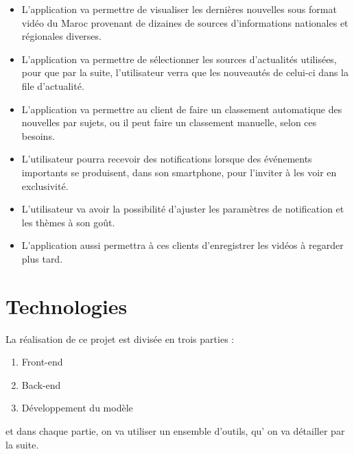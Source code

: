 \begin{itemize}
\item L'application va permettre de visualiser les dernières nouvelles sous format vidéo du Maroc provenant de dizaines de sources d'informations nationales et régionales diverses.
\item L'application va permettre de sélectionner les sources d'actualités utilisées, pour que par la suite, l'utilisateur verra que les nouveautés de  celui-ci dans la file d'actualité.
\item L'application va permettre au client de faire  un classement automatique des nouvelles par sujets, ou il peut faire un classement manuelle, selon ces besoins.
\item L'utilisateur pourra recevoir des notifications lorsque des événements importants se produisent, dans son smartphone, pour l'inviter à les voir en exclusivité.
\item L'utilisateur va avoir la possibilité d'ajuster les paramètres de notification et les thèmes à son goût.
\item L'application aussi permettra à ces clients d'enregistrer les vidéos à regarder plus tard.
\end{itemize}


\section{Technologies}
La réalisation de ce projet  est divisée en trois parties :
\begin{enumerate}
 \item Front-end
 \item Back-end
 \item  Développement du modèle
 \end{enumerate} 
 et dans chaque partie, on va utiliser un ensemble d'outils, qu' on va détailler par la suite.
